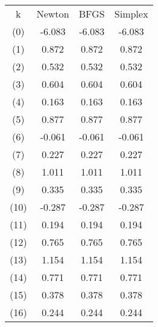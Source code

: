 \begin{tabular}{cccc}
k & Newton & BFGS & Simplex \\
(0) & -6.083 & -6.083 & -6.083 \\
(1) & 0.872 & 0.872 & 0.872 \\
(2) & 0.532 & 0.532 & 0.532 \\
(3) & 0.604 & 0.604 & 0.604 \\
(4) & 0.163 & 0.163 & 0.163 \\
(5) & 0.877 & 0.877 & 0.877 \\
(6) & -0.061 & -0.061 & -0.061 \\
(7) & 0.227 & 0.227 & 0.227 \\
(8) & 1.011 & 1.011 & 1.011 \\
(9) & 0.335 & 0.335 & 0.335 \\
(10) & -0.287 & -0.287 & -0.287 \\
(11) & 0.194 & 0.194 & 0.194 \\
(12) & 0.765 & 0.765 & 0.765 \\
(13) & 1.154 & 1.154 & 1.154 \\
(14) & 0.771 & 0.771 & 0.771 \\
(15) & 0.378 & 0.378 & 0.378 \\
(16) & 0.244 & 0.244 & 0.244 \\
\end{tabular}
